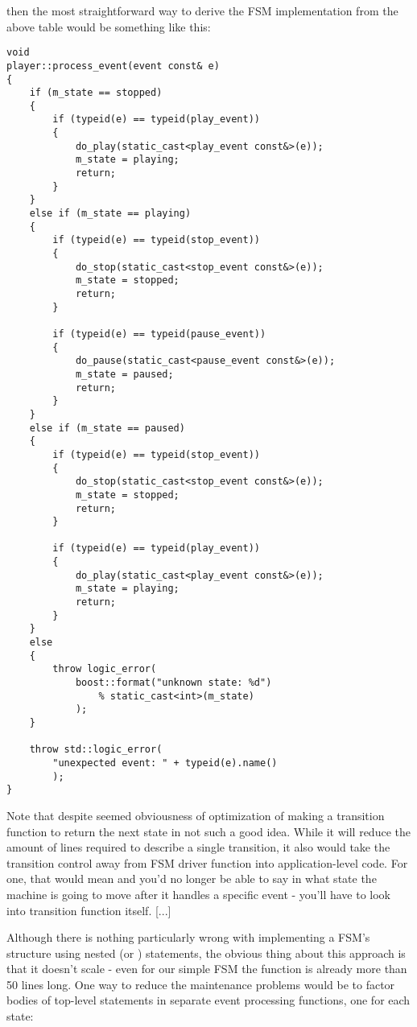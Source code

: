 \documentclass{kapproc}
\begin{document}
then the most straightforward way to derive the FSM 
implementation from the above table would be something 
like this:

{\small
\begin{codesamp}\begin{verbatim}
void
player::process_event(event const& e)
{
    if (m_state == stopped)
    {
        if (typeid(e) == typeid(play_event))
        {
            do_play(static_cast<play_event const&>(e));
            m_state = playing;
            return;
        }
    }
    else if (m_state == playing)
    {
        if (typeid(e) == typeid(stop_event))
        {
            do_stop(static_cast<stop_event const&>(e));
            m_state = stopped;
            return;
        }

        if (typeid(e) == typeid(pause_event))
        {
            do_pause(static_cast<pause_event const&>(e));
            m_state = paused;
            return;
        }
    }
    else if (m_state == paused)
    {
        if (typeid(e) == typeid(stop_event))
        {
            do_stop(static_cast<stop_event const&>(e));
            m_state = stopped;
            return;
        }

        if (typeid(e) == typeid(play_event))
        {
            do_play(static_cast<play_event const&>(e));
            m_state = playing;
            return;
        }
    }
    else
    {
        throw logic_error(
            boost::format("unknown state: %d")
                % static_cast<int>(m_state)
            );
    }

    throw std::logic_error(
        "unexpected event: " + typeid(e).name()
        );
}
\end{verbatim}
\end{codesamp}
}

Note that despite seemed obviousness of optimization of making 
a transition function to return the next state in not such a 
good idea. While it will reduce the amount of lines required 
to describe a single transition, it also would take the 
transition control away from FSM driver function into 
application-level code. For one, that would mean and you'd no 
longer be able to say in what state the machine is going to 
move after it handles a specific event - you'll have to look 
into transition function itself. [...] 

Although there is nothing particularly wrong with implementing 
a FSM's structure using nested  (or )
statements, the obvious thing about this approach is that it 
doesn't scale - even for our simple FSM the 
 function is already more than 50 lines
long. One way to reduce the maintenance problems would be to 
factor bodies of top-level  statements in separate 
event processing functions, one for each state:
\end{document}
